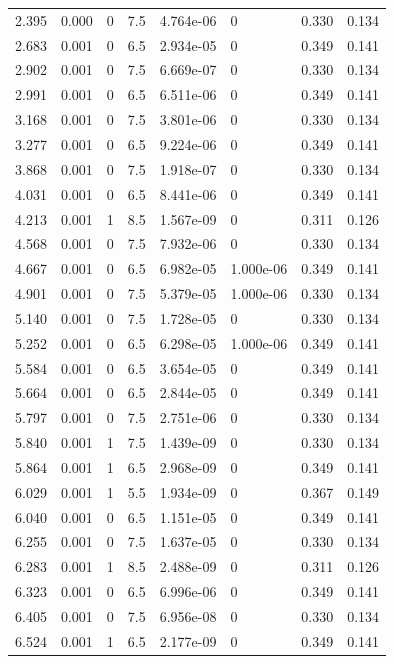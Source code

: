 \documentclass[preview]{standalone}
\begin{document}
{{\begin{tabular}{L{1.2cm}C{1.2cm} C{0.3cm}C{0.5cm} C{1.4cm}C{1.4cm} C{1.4cm}C{1.4cm}}
  2.395  &  0.000  & 0     & 7.5 &  4.764e-06  & 0  & 0.330 &  0.134   \\ 
  2.683  &  0.001  & 0     & 6.5 &  2.934e-05  & 0  & 0.349 &  0.141   \\ 
  2.902  &  0.001  & 0     & 7.5 &  6.669e-07  & 0  & 0.330 &  0.134   \\ 
  2.991  &  0.001  & 0     & 6.5 &  6.511e-06  & 0  & 0.349 &  0.141   \\ 
  3.168  &  0.001  & 0     & 7.5 &  3.801e-06  & 0  & 0.330 &  0.134   \\ 
  3.277  &  0.001  & 0     & 6.5 &  9.224e-06  & 0  & 0.349 &  0.141   \\ 
  3.868  &  0.001  & 0     & 7.5 &  1.918e-07  & 0  & 0.330 &  0.134   \\ 
  4.031  &  0.001  & 0     & 6.5 &  8.441e-06  & 0  & 0.349 &  0.141   \\ 
  4.213  &  0.001  & 1     & 8.5 &  1.567e-09  & 0  & 0.311 &  0.126   \\ 
  4.568  &  0.001  & 0     & 7.5 &  7.932e-06  & 0  & 0.330 &  0.134   \\ 
  4.667  &  0.001  & 0     & 6.5 &  6.982e-05  & 1.000e-06  & 0.349 &  0.141   \\ 
  4.901  &  0.001  & 0     & 7.5 &  5.379e-05  & 1.000e-06  & 0.330 &  0.134   \\ 
  5.140  &  0.001  & 0     & 7.5 &  1.728e-05  & 0  & 0.330 &  0.134   \\ 
  5.252  &  0.001  & 0     & 6.5 &  6.298e-05  & 1.000e-06  & 0.349 &  0.141   \\ 
  5.584  &  0.001  & 0     & 6.5 &  3.654e-05  & 0  & 0.349 &  0.141   \\ 
  5.664  &  0.001  & 0     & 6.5 &  2.844e-05  & 0  & 0.349 &  0.141   \\ 
  5.797  &  0.001  & 0     & 7.5 &  2.751e-06  & 0  & 0.330 &  0.134   \\ 
  5.840  &  0.001  & 1     & 7.5 &  1.439e-09  & 0  & 0.330 &  0.134   \\ 
  5.864  &  0.001  & 1     & 6.5 &  2.968e-09  & 0  & 0.349 &  0.141   \\ 
  6.029  &  0.001  & 1     & 5.5 &  1.934e-09  & 0  & 0.367 &  0.149   \\ 
  6.040  &  0.001  & 0     & 6.5 &  1.151e-05  & 0  & 0.349 &  0.141   \\ 
  6.255  &  0.001  & 0     & 7.5 &  1.637e-05  & 0  & 0.330 &  0.134   \\ 
  6.283  &  0.001  & 1     & 8.5 &  2.488e-09  & 0  & 0.311 &  0.126   \\ 
  6.323  &  0.001  & 0     & 6.5 &  6.996e-06  & 0  & 0.349 &  0.141   \\ 
  6.405  &  0.001  & 0     & 7.5 &  6.956e-08  & 0  & 0.330 &  0.134   \\ 
  6.524  &  0.001  & 1     & 6.5 &  2.177e-09  & 0  & 0.349 &  0.141   \\ 
\hline 
\end{tabular} 

}}
\end{document}
